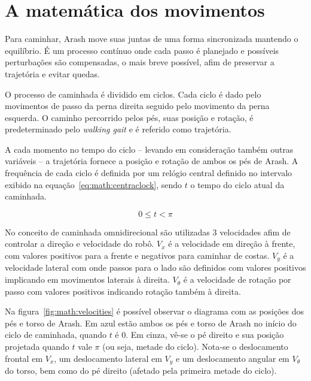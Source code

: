 \chapter{A matemática dos movimentos}
\label{ch:Math}

Para caminhar, Arash move suas juntas de uma forma sincronizada mantendo o equilíbrio. É um processo contínuo onde cada passo é planejado e possíveis perturbações são compensadas, o mais breve possível, afim de preservar a trajetória e evitar quedas.

O processo de caminhada é dividido em ciclos. Cada ciclo é dado pelo movimentos de passo da perna direita seguido pelo movimento da perna esquerda. O caminho percorrido pelos pés, suas posição e rotação, é predeterminado pelo \textit{walking gait} e é referido como trajetória.

A cada momento no tempo do ciclo -- levando em consideração também outras variáveis -- a trajetória fornece a posição e rotação de ambos os pés de Arash. A frequência de cada ciclo é definida por um relógio central definido no intervalo exibido na equação~\ref{eq:math:centraclock}, sendo $t$ o tempo do ciclo atual da caminhada.

\begin{equation}
	\label{eq:math:centraclock}
	0 \leq t < \pi
\end{equation}

No conceito de caminhada omnidirecional são utilizadas 3 velocidades afim de controlar a direção e velocidade do robô. $V_x$ é a velocidade em direção à frente, com valores positivos para a frente e negativos para caminhar de costas. $V_y$ é a velocidade lateral com onde passos para o lado são definidos com valores positivos implicando em movimentos laterais à direita. $V_\theta$ é a velocidade de rotação por passo com valores positivos indicando rotação também à direita.

Na figura~\ref{fig:math:velocities} é possível observar o diagrama com as posições dos pés e torso de Arash. Em azul estão ambos os pés e torso de Arash no início do ciclo de caminhada, quando $t$ é $0$. Em cinza, vê-se o pé direito e sua posição projetada quando $t$ vale $\pi$ (ou seja, metade do ciclo). Nota-se o deslocamento frontal em $V_x$, um deslocamento lateral em $V_y$ e um deslocamento angular em $V_\theta$ do torso, bem como do pé direito (afetado pela primeira metade do ciclo).

